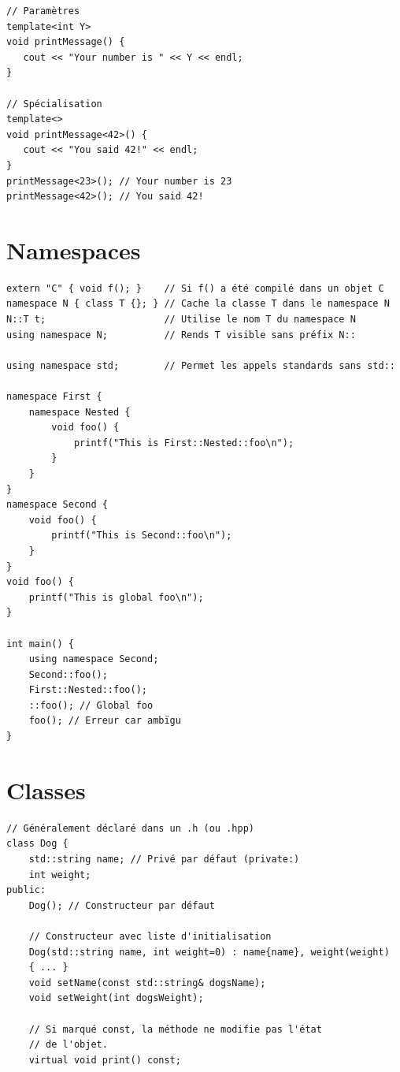 \documentclass{article}
\begin{document}
\begin{multicols*}{3}
\begin{lstlisting}
// Paramètres
template<int Y>
void printMessage() {
   cout << "Your number is " << Y << endl;
}

// Spécialisation
template<>
void printMessage<42>() {
   cout << "You said 42!" << endl;
}
printMessage<23>(); // Your number is 23
printMessage<42>(); // You said 42!

\end{lstlisting}

    \section*{Namespaces}

    \begin{lstlisting}
extern "C" { void f(); }    // Si f() a été compilé dans un objet C
namespace N { class T {}; } // Cache la classe T dans le namespace N
N::T t;                     // Utilise le nom T du namespace N
using namespace N;          // Rends T visible sans préfix N::

using namespace std;        // Permet les appels standards sans std::

namespace First {
    namespace Nested {
        void foo() {
            printf("This is First::Nested::foo\n");
        }
    }
}
namespace Second {
    void foo() {
        printf("This is Second::foo\n");
    }
}
void foo() {
    printf("This is global foo\n");
}

int main() {
    using namespace Second;
    Second::foo();
    First::Nested::foo();
    ::foo(); // Global foo
    foo(); // Erreur car ambïgu
}
\end{lstlisting}

    \section*{Classes}

    \begin{lstlisting}
// Généralement déclaré dans un .h (ou .hpp)
class Dog {
    std::string name; // Privé par défaut (private:)
    int weight;
public:
    Dog(); // Constructeur par défaut

    // Constructeur avec liste d'initialisation
    Dog(std::string name, int weight=0) : name{name}, weight(weight)
    { ... }
    void setName(const std::string& dogsName);
    void setWeight(int dogsWeight);

    // Si marqué const, la méthode ne modifie pas l'état
    // de l'objet.
    virtual void print() const;


\end{lstlisting}
\end{multicols*}
\end{document}
